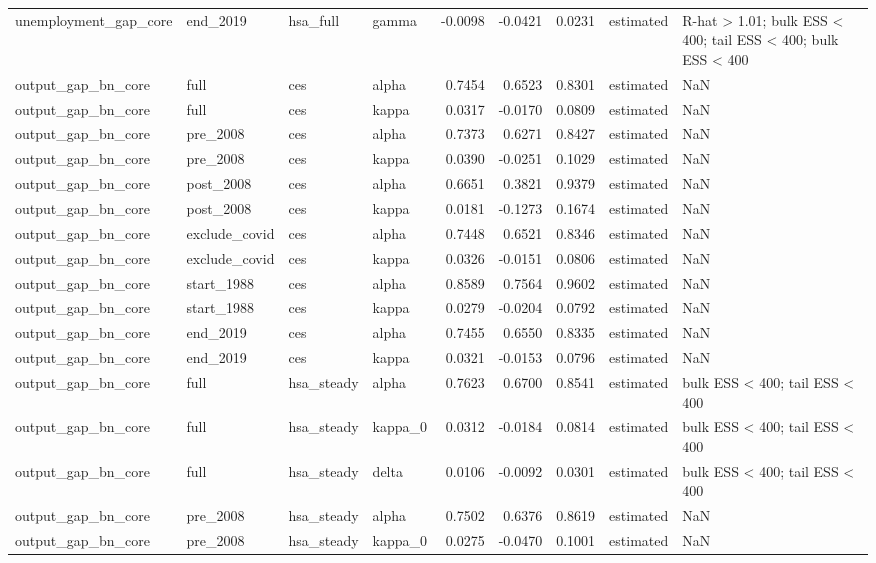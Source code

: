 \begin{tabular}{llllrrrll}
unemployment\_gap\_core & end\_2019 & hsa\_full & gamma & -0.0098 & -0.0421 & 0.0231 & estimated & R-hat > 1.01; bulk ESS < 400; tail ESS < 400; bulk ESS < 400 \\
output\_gap\_bn\_core & full & ces & alpha & 0.7454 & 0.6523 & 0.8301 & estimated & NaN \\
output\_gap\_bn\_core & full & ces & kappa & 0.0317 & -0.0170 & 0.0809 & estimated & NaN \\
output\_gap\_bn\_core & pre\_2008 & ces & alpha & 0.7373 & 0.6271 & 0.8427 & estimated & NaN \\
output\_gap\_bn\_core & pre\_2008 & ces & kappa & 0.0390 & -0.0251 & 0.1029 & estimated & NaN \\
output\_gap\_bn\_core & post\_2008 & ces & alpha & 0.6651 & 0.3821 & 0.9379 & estimated & NaN \\
output\_gap\_bn\_core & post\_2008 & ces & kappa & 0.0181 & -0.1273 & 0.1674 & estimated & NaN \\
output\_gap\_bn\_core & exclude\_covid & ces & alpha & 0.7448 & 0.6521 & 0.8346 & estimated & NaN \\
output\_gap\_bn\_core & exclude\_covid & ces & kappa & 0.0326 & -0.0151 & 0.0806 & estimated & NaN \\
output\_gap\_bn\_core & start\_1988 & ces & alpha & 0.8589 & 0.7564 & 0.9602 & estimated & NaN \\
output\_gap\_bn\_core & start\_1988 & ces & kappa & 0.0279 & -0.0204 & 0.0792 & estimated & NaN \\
output\_gap\_bn\_core & end\_2019 & ces & alpha & 0.7455 & 0.6550 & 0.8335 & estimated & NaN \\
output\_gap\_bn\_core & end\_2019 & ces & kappa & 0.0321 & -0.0153 & 0.0796 & estimated & NaN \\
output\_gap\_bn\_core & full & hsa\_steady & alpha & 0.7623 & 0.6700 & 0.8541 & estimated & bulk ESS < 400; tail ESS < 400 \\
output\_gap\_bn\_core & full & hsa\_steady & kappa\_0 & 0.0312 & -0.0184 & 0.0814 & estimated & bulk ESS < 400; tail ESS < 400 \\
output\_gap\_bn\_core & full & hsa\_steady & delta & 0.0106 & -0.0092 & 0.0301 & estimated & bulk ESS < 400; tail ESS < 400 \\
output\_gap\_bn\_core & pre\_2008 & hsa\_steady & alpha & 0.7502 & 0.6376 & 0.8619 & estimated & NaN \\
output\_gap\_bn\_core & pre\_2008 & hsa\_steady & kappa\_0 & 0.0275 & -0.0470 & 0.1001 & estimated & NaN \\

\end{tabular}

